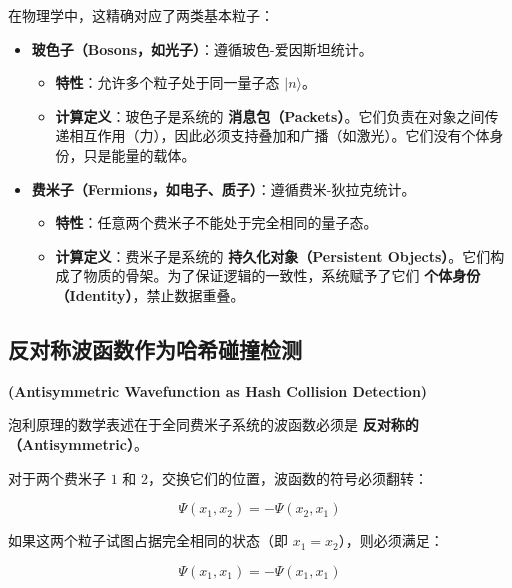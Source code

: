 在物理学中，这精确对应了两类基本粒子：

\begin{itemize}
\item \textbf{玻色子（Bosons，如光子）}：遵循玻色-爱因斯坦统计。

    \begin{itemize}
    \item \textbf{特性}：允许多个粒子处于同一量子态 $|n\rangle$。

    \item \textbf{计算定义}：玻色子是系统的 \textbf{消息包（Packets）}。它们负责在对象之间传递相互作用（力），因此必须支持叠加和广播（如激光）。它们没有个体身份，只是能量的载体。
    \end{itemize}

\item \textbf{费米子（Fermions，如电子、质子）}：遵循费米-狄拉克统计。

    \begin{itemize}
    \item \textbf{特性}：任意两个费米子不能处于完全相同的量子态。

    \item \textbf{计算定义}：费米子是系统的 \textbf{持久化对象（Persistent Objects）}。它们构成了物质的骨架。为了保证逻辑的一致性，系统赋予了它们 \textbf{个体身份（Identity）}，禁止数据重叠。
    \end{itemize}
\end{itemize}

\subsection{反对称波函数作为哈希碰撞检测}

\textbf{(Antisymmetric Wavefunction as Hash Collision Detection)}

泡利原理的数学表述在于全同费米子系统的波函数必须是 \textbf{反对称的（Antisymmetric）}。

对于两个费米子 $1$ 和 $2$，交换它们的位置，波函数的符号必须翻转：

\begin{equation}
\Psi(x_1, x_2) = -\Psi(x_2, x_1)
\end{equation}

如果这两个粒子试图占据完全相同的状态（即 $x_1 = x_2$），则必须满足：

\begin{equation}
\Psi(x_1, x_1) = -\Psi(x_1, x_1)
\end{equation}

